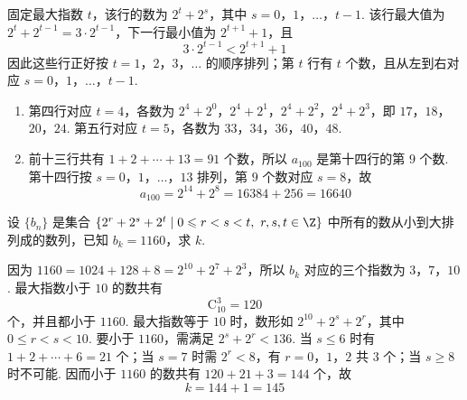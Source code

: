 \begin{solution}
固定最大指数 \(t\)，该行的数为 \(2^t+2^s\)，其中 \(s=0\)，\(1\)，\(\ldots\)，\(t-1\). 该行最大值为 \(2^t+2^{t-1}=3\cdot2^{t-1}\)，下一行最小值为 \(2^{t+1}+1\)，且
\[
3\cdot2^{t-1}<2^{t+1}+1
\]
因此这些行正好按 \(t=1\)，\(2\)，\(3\)，\(\ldots\) 的顺序排列；第 \(t\) 行有 \(t\) 个数，且从左到右对应 \(s=0\)，\(1\)，\(\ldots\)，\(t-1\).
\begin{enumerate}
\item 第四行对应 \(t=4\)，各数为 \(2^4+2^0\)，\(2^4+2^1\)，\(2^4+2^2\)，\(2^4+2^3\)，即 \(17\)，\(18\)，\(20\)，\(24\). 第五行对应 \(t=5\)，各数为 \(33\)，\(34\)，\(36\)，\(40\)，\(48\).
\item 前十三行共有 \(1+2+\cdots+13=91\) 个数，所以 \(a_{100}\) 是第十四行的第 \(9\) 个数. 第十四行按 \(s=0\)，\(1\)，\(\ldots\)，\(13\) 排列，第 \(9\) 个数对应 \(s=8\)，故
\[
a_{100}=2^{14}+2^8=16384+256=16640
\]
\end{enumerate}
\end{solution}

\begin{problem}
设 \(\{b_n\}\) 是集合 \(\{2^{r} + 2^{s} + 2^{t} \mid 0 \leqslant r < s < t,\ r, s, t \in \Z\}\) 中所有的数从小到大排列成的数列，已知 \(b_k = 1160\)，求 \(k\).
\end{problem}

\begin{solution}
因为 \(1160=1024+128+8=2^{10}+2^7+2^3\)，所以 \(b_k\) 对应的三个指数为 \(3\)，\(7\)，\(10\). 最大指数小于 \(10\) 的数共有
\[
\mathrm C_{10}^3=120
\]
个，并且都小于 \(1160\). 最大指数等于 \(10\) 时，数形如 \(2^{10}+2^s+2^r\)，其中 \(0\leqslant r<s<10\). 要小于 \(1160\)，需满足 \(2^s+2^r<136\). 当 \(s\leqslant6\) 时有 \(1+2+\cdots+6=21\) 个；当 \(s=7\) 时需 \(2^r<8\)，有 \(r=0\)，\(1\)，\(2\) 共 \(3\) 个；当 \(s\geqslant8\) 时不可能. 因而小于 \(1160\) 的数共有 \(120+21+3=144\) 个，故
\[
k=144+1=145
\]
\end{solution}
